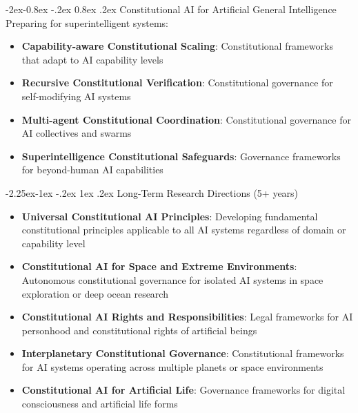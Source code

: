 \documentclass[manuscript,screen,9pt]{acmart}
\makeatletter
\renewcommand\subsection{\@startsection{subsection}{2}{\z@}%
  {-2.25ex\@plus -1ex \@minus -.2ex}%
  {1ex \@plus .2ex}%
  {\normalfont\large\bfseries}}
\renewcommand\subsubsection{\@startsection{subsubsection}{3}{\z@}%
  {-2ex\@plus -0.8ex \@minus -.2ex}%
  {0.8ex \@plus .2ex}%
  {\normalfont\normalsize\bfseries}}
\makeatother
\begin{document}
\subsubsection{Constitutional AI for Artificial General Intelligence}
Preparing for superintelligent systems:
\begin{itemize}[leftmargin=*,itemsep=1pt,parsep=1pt]
	\item \textbf{Capability-aware Constitutional Scaling}: Constitutional frameworks that adapt to AI capability levels
	\item \textbf{Recursive Constitutional Verification}: Constitutional governance for self-modifying AI systems
	\item \textbf{Multi-agent Constitutional Coordination}: Constitutional governance for AI collectives and swarms
	\item \textbf{Superintelligence Constitutional Safeguards}: Governance frameworks for beyond-human AI capabilities
\end{itemize}

\subsection{Long-Term Research Directions (5+ years)}
\label{subsec:long_term_research}
\begin{itemize}[leftmargin=*,itemsep=1pt,parsep=1pt]
	\item \textbf{Universal Constitutional AI Principles}: Developing fundamental constitutional principles applicable to all AI systems regardless of domain or capability level
	\item \textbf{Constitutional AI for Space and Extreme Environments}: Autonomous constitutional governance for isolated AI systems in space exploration or deep ocean research
	\item \textbf{Constitutional AI Rights and Responsibilities}: Legal frameworks for AI personhood and constitutional rights of artificial beings
	\item \textbf{Interplanetary Constitutional Governance}: Constitutional frameworks for AI systems operating across multiple planets or space environments
	\item \textbf{Constitutional AI for Artificial Life}: Governance frameworks for digital consciousness and artificial life forms
\end{itemize}
\end{document}
